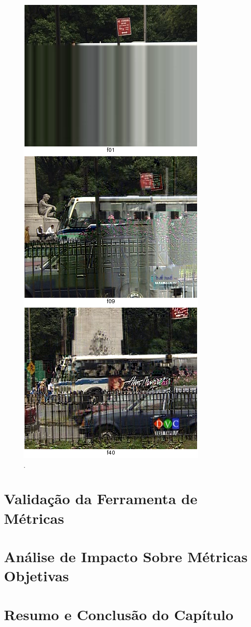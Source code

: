 \begin{figure}[!htb]
	\centering
	\includegraphics[height=0.9\textheight]{./imgs/netsim.png}
	\caption{.}
	\label{fig:netsim}
\end{figure}

\section{Validação da Ferramenta de Métricas}

\section{Análise de Impacto Sobre Métricas Objetivas}

\section{Resumo e Conclusão do Capítulo}
